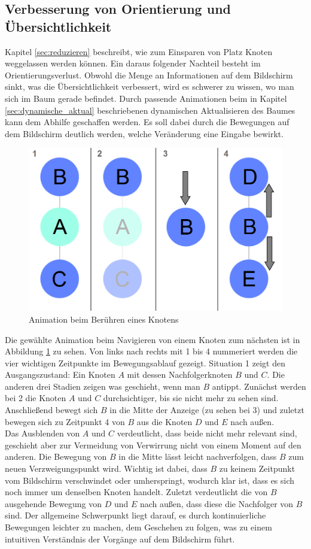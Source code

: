 \subsection{Verbesserung von Orientierung und Übersichtlichkeit}
Kapitel \ref{sec:reduzieren} beschreibt, wie zum Einsparen von Platz Knoten weggelassen werden können. Ein daraus folgender Nachteil besteht im Orientierungsverlust. Obwohl die Menge an Informationen auf dem Bildschirm sinkt, was die Übersichtlichkeit verbessert, wird es schwerer zu wissen, wo man sich im Baum gerade befindet. Durch passende Animationen beim in Kapitel \ref{sec:dynamische_aktual} beschriebenen dynamischen Aktualisieren des Baumes kann dem Abhilfe geschaffen werden. Es soll dabei durch die Bewegungen auf dem Bildschirm deutlich werden, welche Veränderung eine Eingabe bewirkt. 
\begin{figure}
	\centering
	\includegraphics[width=\linewidth]{../screenshots/animation.png}
	\caption{Animation beim Berühren eines Knotens}
	\label{abb:animation}
\end{figure}
Die gewählte Animation beim Navigieren von einem Knoten zum nächsten ist in Abbildung \ref{abb:animation} zu sehen. Von links nach rechts mit 1 bis 4 nummeriert werden die vier wichtigen Zeitpunkte im Bewegungsablauf gezeigt. Situation 1 zeigt den Ausgangszustand: Ein Knoten $A$ mit dessen Nachfolgerknoten $B$ und $C$. Die anderen drei Stadien zeigen was geschieht, wenn man $B$ antippt. Zunächst werden bei 2 die Knoten $A$ und $C$ durchsichtiger, bis sie nicht mehr zu sehen sind. Anschließend bewegt sich $B$ in die Mitte der Anzeige (zu sehen bei 3) und zuletzt bewegen sich zu Zeitpunkt 4 von $B$ aus die Knoten $D$ und $E$ nach außen. \\
Das Ausblenden von $A$ und $C$ verdeutlicht, dass beide nicht mehr relevant sind, geschieht aber zur Vermeidung von Verwirrung nicht von einem Moment auf den anderen. Die Bewegung von $B$ in die Mitte lässt leicht nachverfolgen, dass $B$ zum neuen Verzweigungspunkt wird. Wichtig ist dabei, dass $B$ zu keinem Zeitpunkt vom Bildschirm verschwindet oder umherspringt, wodurch klar ist, dass es sich noch immer um denselben Knoten handelt. Zuletzt verdeutlicht die von $B$ ausgehende Bewegung von $D$ und $E$ nach außen, dass diese die Nachfolger von $B$ sind. Der allgemeine Schwerpunkt liegt darauf, es durch kontinuierliche Bewegungen leichter zu machen, dem Geschehen zu folgen, was zu einem intuitiven Verständnis der Vorgänge auf dem Bildschirm führt.

